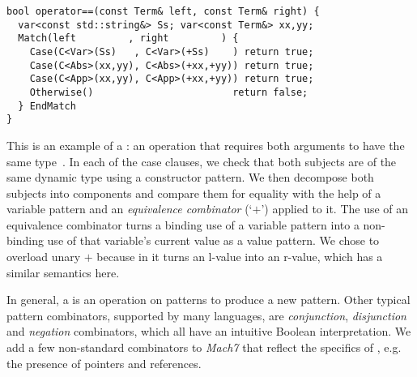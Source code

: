 
\begin{lstlisting}[columns=flexible,keepspaces]
bool operator==(const Term& left, const Term& right) {
  var<const std::string&> Ss; var<const Term&> xx,yy;
  Match(left         , right         ) {
    Case(C<Var>(Ss)   , C<Var>(+Ss)    ) return true;
    Case(C<Abs>(xx,yy), C<Abs>(+xx,+yy)) return true;
    Case(C<App>(xx,yy), C<App>(+xx,+yy)) return true;
    Otherwise()                        return false;
  } EndMatch
}
\end{lstlisting}

\noindent
This \code{==} is an example of a : an operation that 
requires both arguments to have the same type~\cite{BCCLP95}. In each of the 
case clauses, we check that both subjects are of the same dynamic type using a
constructor pattern. We then decompose both subjects into components and compare 
them for equality with the help of a variable pattern and an \emph{equivalence 
combinator} (`$+$') applied to it. The use of an equivalence combinator turns a binding 
use of a variable pattern into a non-binding use of that variable's current 
value as a value pattern. We chose to overload unary $+$ because in \Cpp{} it 
turns an l-value into an r-value, which has a similar semantics here.

In general, a  is an operation on patterns to produce a 
new pattern. Other typical pattern combinators, supported by many languages, are
\emph{conjunction}, \emph{disjunction} and \emph{negation} combinators, which all have an 
intuitive Boolean interpretation. We add a few non-standard combinators to 
\emph{Mach7} that reflect the specifics of \Cpp{}, e.g. the presence of pointers and 
references.

